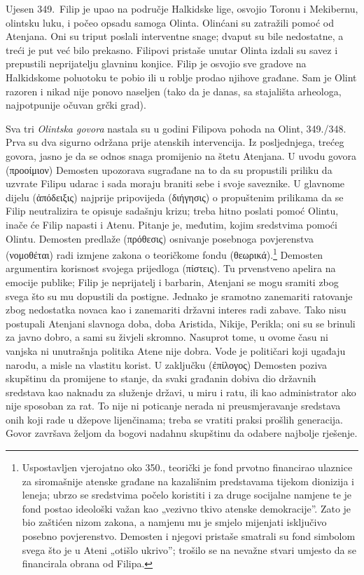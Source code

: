 Ujesen 349.\ Filip je upao na područje Halkidske lige, osvojio Toronu i Mekibernu, olintsku luku, i počeo opsadu samoga Olinta. Olinćani su zatražili pomoć od Atenjana. Oni su triput poslali interventne snage; dvaput su bile nedostatne, a treći je put već bilo prekasno. Filipovi pristaše unutar Olinta izdali su savez i prepustili neprijatelju glavninu konjice. Filip je osvojio sve gradove na Halkidskome poluotoku te pobio ili u roblje prodao njihove građane. Sam je Olint razoren i nikad nije ponovo naseljen (tako da je danas, sa stajališta arheologa, najpotpunije očuvan grčki grad).

Sva tri \textit{Olintska govora} nastala su u godini Filipova pohoda na Olint, 349./348. Prva su dva sigurno održana prije atenskih intervencija. Iz posljednjega, trećeg govora, jasno je da se odnos snaga promijenio na štetu Atenjana. U uvodu govora \textgreek[variant=ancient]{(προοίμιον)} Demosten upozorava sugrađane na to da su propustili priliku da uzvrate Filipu udarac i sada moraju braniti sebe i svoje saveznike. U glavnome dijelu \textgreek[variant=ancient]{(ἀπόδειξις)} najprije pripovijeda  \textgreek[variant=ancient]{(διήγησις)} o propuštenim prilikama da se Filip neutralizira te opisuje sadašnju krizu; treba hitno poslati pomoć Olintu, inače će Filip napasti i Atenu. Pitanje je, međutim, kojim sredstvima pomoći Olintu. Demosten predlaže \textgreek[variant=ancient]{(πρόθεσις)} osnivanje posebnoga povjerenstva \textgreek[variant=ancient]{(νομοθέται)} radi izmjene zakona o teoričkome fondu \textgreek[variant=ancient]{(θεωρικά).}\footnote{Uspostavljen vjerojatno oko 350., teorički je fond prvotno financirao ulaznice za siromašnije atenske građane na kazališnim predstavama tijekom dionizija i leneja; ubrzo se sredstvima počelo koristiti i za druge socijalne namjene te je fond postao ideološki važan kao „vezivno tkivo atenske demokracije”. Zato je bio zaštićen nizom zakona, a namjenu mu je smjelo mijenjati isključivo posebno povjerenstvo. Demosten i njegovi pristaše smatrali su fond simbolom svega što je u Ateni „otišlo ukrivo”; trošilo se na nevažne stvari umjesto da se financirala obrana od Filipa.} Demosten argumentira korisnost svojega prijedloga (πίστεις). Tu prvenstveno apelira na emocije publike; Filip je neprijatelj i barbarin, Atenjani se mogu sramiti zbog svega što su mu dopustili da postigne. Jednako je sramotno zanemariti ratovanje zbog nedostatka novaca kao i zanemariti državni interes radi zabave. Tako nisu postupali Atenjani slavnoga doba, doba Aristida, Nikije, Perikla; oni su se brinuli za javno dobro, a sami su živjeli skromno. Nasuprot tome, u ovome času ni vanjska ni unutrašnja politika Atene nije dobra. Vode je političari koji ugađaju narodu, a misle na vlastitu korist. U zaključku (ἐπίλογος) Demosten poziva skupštinu da promijene to stanje, da svaki građanin dobiva dio državnih sredstava kao naknadu za služenje državi, u miru i ratu, ili kao administrator ako nije sposoban za rat. To nije ni poticanje nerada ni preusmjeravanje sredstava onih koji rade u džepove lijenčinama; treba se vratiti praksi prošlih generacija. Govor završava željom da bogovi nadahnu skupštinu da odabere najbolje rješenje.

